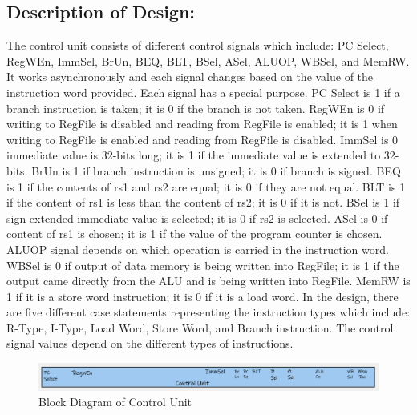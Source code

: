 \documentclass[10pt,letterpaper]{article}
\begin{document}
\subsection{Description of Design:}
The control unit consists of different control signals which include: PC Select, RegWEn, ImmSel, BrUn, BEQ, BLT, BSel, ASel, ALUOP, WBSel, and MemRW. It works asynchronously and each signal changes based on the value of the instruction word provided. Each signal has a special purpose. PC Select is 1 if a branch instruction is taken; it is 0 if the branch is not taken. RegWEn is 0 if writing to RegFile is disabled and reading from RegFile is enabled; it is 1 when writing to RegFile is enabled and reading from RegFile is disabled. ImmSel is 0 immediate value is 32-bits long; it is 1 if the immediate value is extended to 32-bits. BrUn is 1 if branch instruction is unsigned; it is 0 if branch is signed. BEQ is 1 if the contents of rs1 and rs2 are equal; it is 0 if they are not equal.  BLT is 1 if the content of rs1 is less than the content of rs2; it is 0 if it is not. BSel is 1 if sign-extended immediate value is selected; it is 0 if rs2 is selected. ASel is 0 if content of rs1 is chosen; it is 1 if the value of the program counter is chosen. ALUOP signal depends on which operation is carried in the instruction word. WBSel is 0 if output of data memory is being written into RegFile; it is 1 if the output came directly from the ALU and is being written into RegFile. MemRW is 1 if it is a store word instruction; it is 0 if it is a load word. In the design, there are five different case statements representing the instruction types which include: R-Type, I-Type, Load Word, Store Word, and Branch instruction. The control signal values depend on the different types of instructions. 
\begin{figure}[H]
	\centering
	\includegraphics[width=0.7\linewidth]{Figures/ControlUnit}
	\caption{Block Diagram of Control Unit}
	\label{fig:controlunit}
\end{figure}
\end{document}
